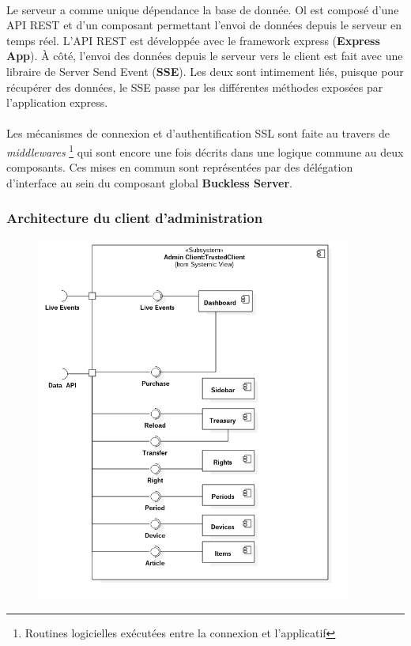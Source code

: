         \paragraph{}
            Le serveur a comme unique dépendance la base de donnée. Ol est composé d'une API REST
            et d'un composant permettant l'envoi de données depuis le serveur en temps réel.
            L'API REST est développée avec le framework express (\textbf{Express App}). À côté,
            l'envoi des données depuis le serveur vers le client  est fait avec une libraire de Server Send Event (\textbf{SSE}).
            Les deux sont intimement liés, puisque pour récupérer des données, le SSE passe par les différentes méthodes
            exposées par l'application express.

        \paragraph{}
            Les mécanismes de connexion et d'authentification SSL sont faite au travers de \textit{middlewares}
            \footnote{Routines logicielles exécutées entre la connexion et l'applicatif} qui sont encore
            une fois décrits dans une logique commune au deux composants. Ces mises en commun sont représentées
            par des délégation d'interface au sein du composant global \textbf{Buckless Server}.

    \newpage
    \subsubsection{Architecture du client d'administration}
        \begin{figure}[h]
            \centering
            \includegraphics[height=12cm]{./assets/UML/admin_client.png}
        \end{figure}

